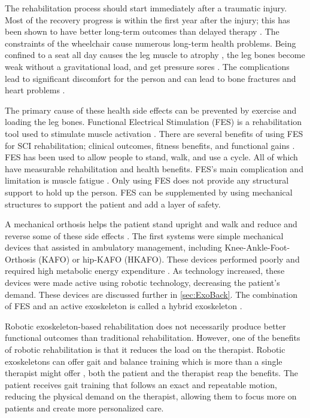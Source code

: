  
 The rehabilitation process should start immediately after a traumatic injury. Most of the recovery progress is within the first year after the injury; this has been shown to have better long-term outcomes than delayed therapy \cite{scivoletto2005early} \cite{piepmeier1988late}.  The constraints of the wheelchair cause numerous long-term health problems. Being confined to a seat all day causes the leg muscle to atrophy \cite{castro1999influence}, the leg bones become weak \cite{goemaere1994bone} without a gravitational load, and get pressure sores \cite{wall2000preventing}. The complications lead to significant discomfort for the person and can lead to bone fractures and heart problems \cite{giangregorio2006bone}.  
 
 The primary cause of these health side effects can be prevented by exercise and loading the leg bones. Functional Electrical Stimulation (FES) is a rehabilitation tool used to stimulate muscle activation  \cite{quintero2012preliminary}. There are several benefits of using FES for SCI rehabilitation; clinical outcomes, fitness benefits, and functional gains \cite{hamid2008role}. FES has been used to allow people to stand, walk, and use a cycle\cite{mazzoleni2013fes}. All of which have measurable rehabilitation and health benefits. FES's main complication and limitation is muscle fatigue \cite{karu1995reducing}. Only using FES  does not provide any structural support to hold up the person. FES can be supplemented by using mechanical structures to support the patient and add a layer of safety. 
 
A mechanical orthosis helps the patient stand upright and walk and reduce and reverse some of these side effects \cite{palermo2017clinician}. The first systems were simple mechanical devices that assisted in ambulatory management, including Knee-Ankle-Foot-Orthosis (KAFO) or hip-KAFO (HKAFO). These devices performed poorly and required high metabolic energy expenditure \cite{del2012review}. As technology increased, these devices were made active using robotic technology, decreasing the patient's demand. These devices are discussed further in \autoref{sec:ExoBack}. The combination of FES and an active exoskeleton is called a hybrid exoskeleton \cite{ha2012enhancing} \cite{alouane2019hybrid}. 

Robotic exoskeleton-based rehabilitation does not necessarily produce better functional outcomes than traditional rehabilitation. However, one of the benefits of robotic rehabilitation is that it reduces the load on the therapist. Robotic exoskeletons can offer gait and balance training which is more than a single therapist might offer \cite{guidingLeg}, both the patient and the therapist reap the benefits. The patient receives gait training that follows an exact and repeatable motion, reducing the physical demand on the therapist, allowing them to focus more on patients and create more personalized care.  


